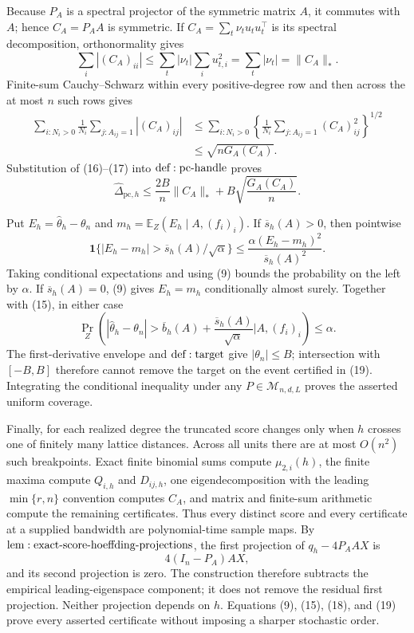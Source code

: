 Because \(P_A\) is a spectral projector of the symmetric matrix \(A\), it commutes with \(A\); hence \(C_A=P_AA\) is symmetric.  If \(C_A=\sum_t\nu_tu_tu_t^\top\) is its spectral decomposition, orthonormality gives
\[
 \sum_i|(C_A)_{ii}|
 \leq\sum_t|\nu_t|\sum_i u_{t,i}^2
 =\sum_t|\nu_t|=\|C_A\|_*.
\tag{16}
\]
Finite-sum Cauchy--Schwarz within every positive-degree row and then across the at most \(n\) such rows gives
\[
\begin{aligned}
 \sum_{i:N_i>0}\frac1{N_i}\sum_{j:A_{ij}=1}|(C_A)_{ij}|
 &\leq\sum_{i:N_i>0}
 \left\{\frac1{N_i}\sum_{j:A_{ij}=1}(C_A)_{ij}^2\right\}^{1/2}\\
 &\leq\sqrt{nG_A(C_A)}.
\end{aligned}
\tag{17}
\]
Substitution of (16)--(17) into \({\rm def:pc\text{-}handle}\) proves
\[
 \widehat\Delta_{\mathrm{pc},h}
 \leq\frac{2B}{n}\|C_A\|_*+B\sqrt{\frac{G_A(C_A)}n}.
\tag{18}
\]

Put \(E_h=\widehat\theta_h-\theta_n\) and \(m_h=\mathbb E_Z(E_h\mid A,(f_i)_i)\).  If \(\overline s_h(A)>0\), then pointwise
\[
 \mathbf1\{|E_h-m_h|>\overline s_h(A)/\sqrt\alpha\}
 \leq\frac{\alpha(E_h-m_h)^2}{\overline s_h(A)^2}.
\]
Taking conditional expectations and using (9) bounds the probability on the left by \(\alpha\).  If \(\overline s_h(A)=0\), (9) gives \(E_h=m_h\) conditionally almost surely.  Together with (15), in either case
\[
 \Pr_Z\!\left(
 |\widehat\theta_h-\theta_n|>
 \overline b_h(A)+\frac{\overline s_h(A)}{\sqrt\alpha}
 \mathrel{\Big|}A,(f_i)_i\right)\leq\alpha.
\tag{19}
\]
The first-derivative envelope and \({\rm def:target}\) give \(|\theta_n|\leq B\); intersection with \([-B,B]\) therefore cannot remove the target on the event certified in (19).  Integrating the conditional inequality under any \(P\in\mathcal M_{n,d,L}\) proves the asserted uniform coverage.

Finally, for each realized degree the truncated score changes only when \(h\) crosses one of finitely many lattice distances.  Across all units there are at most \(O(n^2)\) such breakpoints.  Exact finite binomial sums compute \(\mu_{2,i}(h)\), the finite maxima compute \(Q_{i,h}\) and \(D_{ij,h}\), one eigendecomposition with the leading \(\min\{r,n\}\) convention computes \(C_A\), and matrix and finite-sum arithmetic compute the remaining certificates.  Thus every distinct score and every certificate at a supplied bandwidth are polynomial-time sample maps.  By \({\rm lem:exact\text{-}score\text{-}hoeffding\text{-}projections}\), the first projection of \(q_h-4P_AAX\) is
\[
 4(I_n-P_A)AX,
\]
and its second projection is zero.  The construction therefore subtracts the empirical leading-eigenspace component; it does not remove the residual first projection.  Neither projection depends on \(h\).  Equations (9), (15), (18), and (19) prove every asserted certificate without imposing a sharper stochastic order.